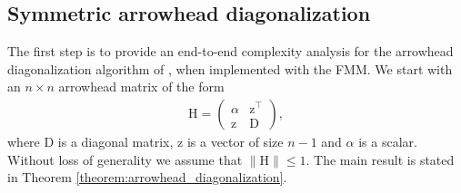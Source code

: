 \documentclass{article}
\newcommand\vecz{\boldsymbol{\mathrm{z}}}
\newcommand\matD{\boldsymbol{\mathrm{D}}}
\newcommand\matH{\boldsymbol{\mathrm{H}}}
\begin{document}
\subsection{Symmetric arrowhead diagonalization}
The first step is to provide an end-to-end complexity analysis for the arrowhead diagonalization algorithm of \cite{gu1995divide}, when implemented with the FMM. We start with an $n\times n$ arrowhead matrix of the form
\begin{align}
    \label{eq:arrowhead}
    \matH=\begin{pmatrix}
        \alpha & \vecz^\top \\
        \vecz & \matD
    \end{pmatrix},
\end{align}
where $\matD$ is a diagonal matrix, $\vecz$ is a vector of size $n-1$ and $\alpha $ is a scalar. Without loss of generality we assume that $\|\matH\|\leq 1$. The main result is stated in Theorem \ref{theorem:arrowhead_diagonalization}. 
\end{document}
